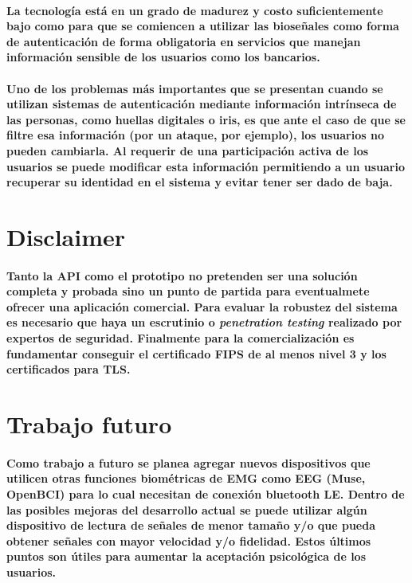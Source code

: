 \documentclass{article}
\begin{document}
\paragraph{
La tecnología está en un grado de madurez y costo suficientemente bajo como para que se comiencen a utilizar las bioseñales como forma de autenticación de forma obligatoria en servicios que manejan información sensible de los usuarios como los bancarios.
}
\paragraph{
Uno de los problemas más importantes que se presentan cuando se utilizan sistemas de autenticación mediante información intrínseca de las personas, como huellas digitales o iris, es que ante el caso de que se filtre esa información (por un ataque, por ejemplo), los usuarios no pueden cambiarla. Al requerir de una participación activa de los usuarios se puede modificar esta información permitiendo a un usuario recuperar su identidad en el sistema y evitar tener ser dado de baja.
}
\section{Disclaimer}
\paragraph{
Tanto la API como el prototipo no pretenden ser una solución completa y probada sino un punto de partida para eventualmete ofrecer una aplicación comercial. Para evaluar la robustez del sistema es necesario que haya un escrutinio o \textit{penetration testing} realizado por expertos de seguridad. Finalmente para la comercialización es fundamentar conseguir el certificado FIPS de al menos nivel 3 y los certificados para TLS.
}
\section{Trabajo futuro}
\paragraph{
Como trabajo a futuro se planea agregar nuevos dispositivos que utilicen otras funciones biométricas de EMG como EEG (Muse, OpenBCI) para lo cual necesitan de conexión bluetooth LE. Dentro de las posibles mejoras del desarrollo actual se puede utilizar algún dispositivo de lectura de señales de menor tamaño y/o que pueda obtener señales con mayor velocidad y/o fidelidad. Estos últimos puntos son útiles para aumentar la aceptación psicológica de los usuarios.
}
\end{document}
